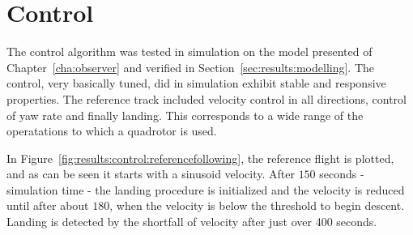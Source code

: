 \section{Control}
\label{sec:results:control}
    The control algorithm was tested in simulation on the model presented
    of Chapter~\ref{cha:observer} and verified in Section~\ref{sec:results:modelling}.
    The control, very basically tuned, did in simulation exhibit stable and responsive
    properties. The reference track included velocity control in all directions,
    control of yaw rate and finally landing. This corresponds to a wide
    range of the operatations to which a quadrotor is used.

    In Figure~\ref{fig:results:control:referencefollowing}, the reference
    flight is plotted, and as can be seen it starts with a sinusoid velocity.
    After $150$ seconds - simulation time - the landing procedure is initialized and the velocity is
    reduced until after about $180$, when the velocity is below the threshold
    to begin descent. Landing is detected by the shortfall of velocity
    after just over 400 seconds.

